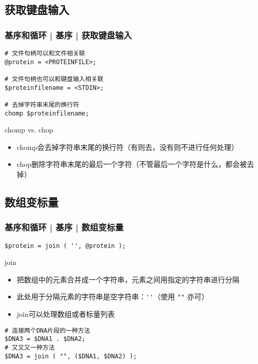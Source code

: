 \subsection{获取键盘输入}
\begin{frame}[fragile]
  \frametitle{基序和循环 | 基序 | \alert{获取键盘输入}}
\begin{lstlisting}
# 文件句柄可以和文件相关联
@protein = <PROTEINFILE>;

# 文件句柄也可以和键盘输入相关联
$proteinfilename = <STDIN>;

# 去掉字符串末尾的换行符
chomp $proteinfilename;
\end{lstlisting} 
\pause
\vspace{-0.5em}
\begin{block}{chomp vs. chop}
  \begin{itemize}
    \item chomp会去掉字符串末尾的换行符（有则去，没有则不进行任何处理）
    \item chop删除字符串末尾的最后一个字符（不管最后一个字符是什么，都会被去掉）
  \end{itemize}
\end{block}
\end{frame}

\subsection{数组变标量}
\begin{frame}[fragile]
  \frametitle{基序和循环 | 基序 | \alert{数组变标量}}
\begin{lstlisting}
$protein = join ( '', @protein );
\end{lstlisting}
\pause
\begin{block}{join}
  \begin{itemize}
    \item 把数组中的元素合并成一个字符串，元素之间用指定的字符串进行分隔
    \item 此处用于分隔元素的字符串是空字符串：\verb|''|（使用 \verb|""| 亦可）
    \item join可以处理数组或者标量列表
  \end{itemize}
\end{block}
\pause
\begin{lstlisting}
# 连接两个DNA片段的一种方法
$DNA3 = $DNA1 . $DNA2;
# 又又又一种方法
$DNA3 = join ( "", ($DNA1, $DNA2) );
\end{lstlisting}
\end{frame}

